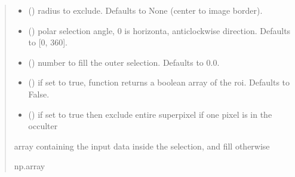 \documentclass[letterpaper,10pt,english]{sphinxmanual}
\begin{document}
\begin{fulllineitems}
\begin{quote}
\begin{description}
\begin{itemize}
\item {} 
\sphinxAtStartPar
{} (\sphinxstyleliteralemphasis{\sphinxupquote{, }}) \textendash{} radius to exclude. Defaults to None (center to image border).

\item {} 
\sphinxAtStartPar
{} (\sphinxstyleliteralemphasis{\sphinxupquote{, }}) \textendash{} polar selection angle, 0 is horizonta, anti\sphinxhyphen{}clockwise direction. Defaults to {[}0, 360{]}.

\item {} 
\sphinxAtStartPar
{} (\sphinxstyleliteralemphasis{\sphinxupquote{, }}) \textendash{} number to fill the outer selection. Defaults to 0.0.

\item {} 
\sphinxAtStartPar
{} (\sphinxstyleliteralemphasis{\sphinxupquote{, }}) \textendash{} if set to true, function returns a boolean array of the roi. Defaults to False.

\item {} 
\sphinxAtStartPar
{} (\sphinxstyleliteralemphasis{\sphinxupquote{, }}) \textendash{} if set to true then exclude entire superpixel if one pixel is in the occulter

\end{itemize}

\sphinxAtStartPar
array containing the input data inside the selection, and fill otherwise

\sphinxAtStartPar
np.array

\end{description}\end{quote}

\end{fulllineitems}
\end{document}
